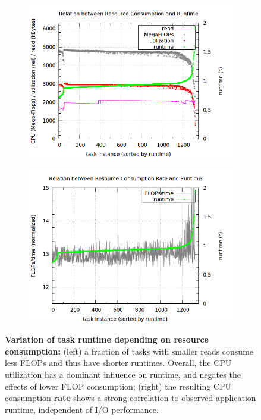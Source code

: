 \documentclass[preprint,12pt]{elsarticle}
\newcommand{\B}[1]{\textbf{#1}\xspace}
\begin{document}
 \begin{figure}
 \centering
 \begin{subfigure}{.5\textwidth}
   \centering
   \includegraphics[width=\textwidth]{experiments/synapse_montage/rs_synapse_2mass_m101_j_6_6_mprojectpp_cpu_3}
 \end{subfigure}%
 \begin{subfigure}{.5\textwidth}
   \centering
   \includegraphics[width=\textwidth]{experiments/synapse_montage/rs_synapse_2mass_m101_j_6_6_mprojectpp_cpu_4}
 \end{subfigure}
  \caption {
      \footnotesize
      \B{Variation of task runtime depending on resource
      consumption:}  (left) a fraction of tasks with smaller reads consume
      less FLOPs and thus have shorter runtimes.  Overall, the CPU utilization 
      has a dominant influence on runtime, and negates the effects of lower FLOP
      consumption; (right) the resulting CPU consumption \B{rate}
      shows a strong correlation to observed application runtime,
      independent of I/O performance.
      \label{fig:synapse_cpu}
      }
 \label{fig:test}
 \end{figure}
\end{document}
